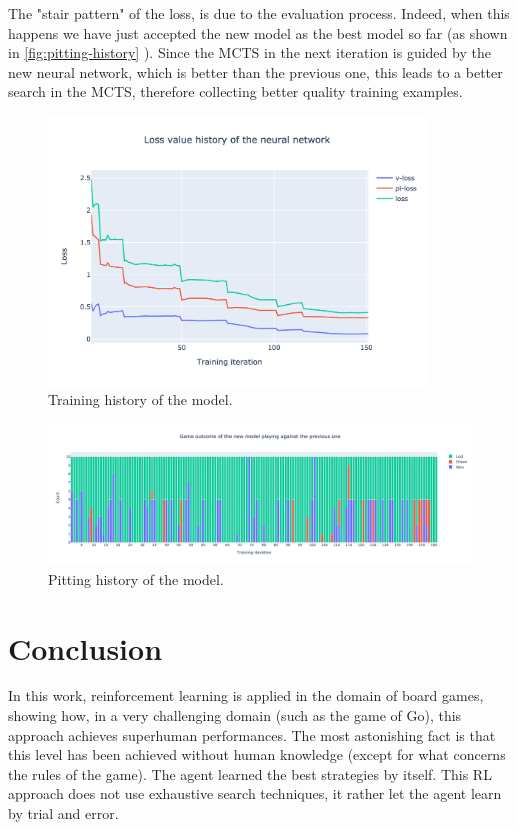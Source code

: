 \documentclass{article}
\begin{document}
The "stair pattern" of the loss, is due to the evaluation process. Indeed, when this happens we have just accepted the new model as the best model so far (as shown in \autoref{fig:pitting-history} ). Since the MCTS in the next iteration is guided by the new neural network, which is better than the previous one, this leads to a better search in the MCTS, therefore collecting better quality training examples.

\begin{figure}[H]
	\centerline{\includegraphics[width=10cm]{training_history.png}}
	\caption{Training history of the model.}
	\label{fig:training-analysis}
\end{figure}


\begin{figure}[H]
	\centerline{\includegraphics[width=\textwidth]{pitting_history.png}}
	\caption{Pitting history of the model.}
	\label{fig:pitting-history}
\end{figure}


\section{Conclusion}
In this work, reinforcement learning is applied in the domain of board games, showing how, in a very challenging domain (such as the game of Go), this approach achieves superhuman performances. The most astonishing fact is that this level has been achieved without human knowledge (except for what concerns the rules of the game). The agent learned the best strategies by itself. This RL approach does not use exhaustive search techniques, it rather let the agent learn by trial and error.
\end{document}
